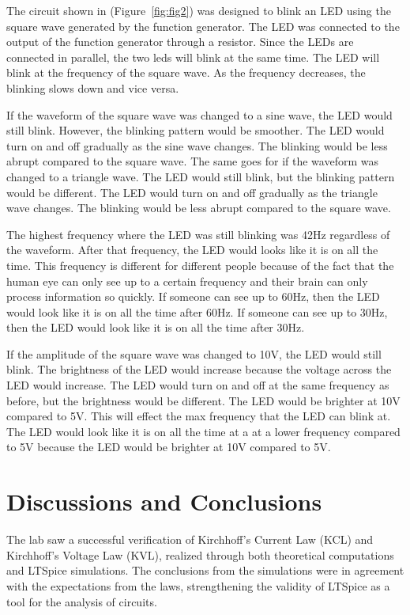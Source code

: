 \documentclass{article}
\begin{document}
The circuit shown in (Figure~\ref{fig:fig2}) was designed to blink an LED using the square wave generated by the function generator. 
The LED was connected to the output of the function generator through a resistor. Since the LEDs are connected in parallel, the two 
leds will blink at the same time. The LED will blink at the frequency of the square wave. As the frequency decreases, the blinking 
slows down and vice versa.
\newline

If the waveform of the square wave was changed to a sine wave, the LED would still blink. However, the blinking pattern would be
smoother. The LED would turn on and off gradually as the sine wave changes. The blinking would be less abrupt compared to the square wave.
The same goes for if the waveform was changed to a triangle wave. The LED would still blink, but the blinking pattern would be different.
The LED would turn on and off gradually as the triangle wave changes. The blinking would be less abrupt compared to the square wave.
\newline

The highest frequency where the LED was still blinking was 42Hz regardless of the waveform. After that frequency, the LED would looks like it is on all the time.
This frequency is different for different people because of the fact that the human eye can only see up to a certain frequency and their brain can only
process information so quickly. If someone can see up to 60Hz, then the LED would look like it is on all the time after 60Hz. If someone can see up to 30Hz, 
then the LED would look like it is on all the time after 30Hz. 
\newline

If the amplitude of the square wave was changed to 10V, the LED would still blink. The brightness of the LED would increase because the voltage across the LED
would increase. The LED would turn on and off at the same frequency as before, but the brightness would be different. The LED would be brighter at 10V compared to 5V.
This will effect the max frequency that the LED can blink at. The LED would look like it is on all the time at a at a lower frequency compared to 5V because 
the LED would be brighter at 10V compared to 5V.


\section{Discussions and Conclusions}
The lab saw a successful verification of Kirchhoff’s Current Law (KCL) and Kirchhoff’s Voltage Law (KVL), 
realized through both theoretical computations and LTSpice simulations. The conclusions from the simulations 
were in agreement with the expectations from the laws, strengthening the validity of LTSpice as a tool for the
 analysis of circuits.
\newline
\end{document}
